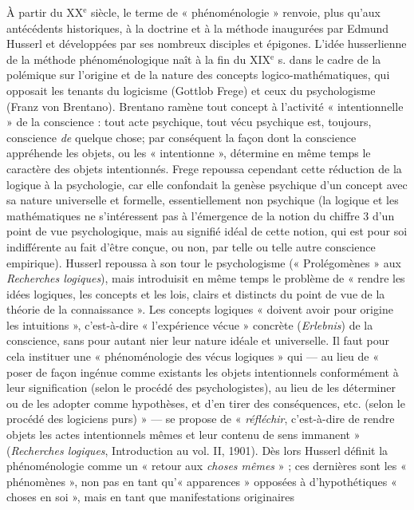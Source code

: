 À partir du {\footnotesize XX}$^\text{e}$ siècle, le terme de « phénoménologie »
renvoie, plus qu'aux antécédents
historiques, à la doctrine et à la
méthode inaugurées par Edmund Husserl
et développées par ses nombreux disciples
et épigones. L'idée husserlienne de la
méthode phénoménologique naît à la fin
du {\footnotesize XIX}$^\text{e}$ s. dans le cadre de la polémique
sur l’origine et de la nature des
concepts  logico-mathématiques, qui
opposait les tenants du logicisme (Gottlob
Frege) et ceux du psychologisme (Franz
von Brentano). Brentano ramène tout
concept à l’activité « intentionnelle » de la
conscience : tout acte psychique, tout
vécu psychique est, toujours, conscience
{\it de} quelque chose; par conséquent la
façon dont la conscience appréhende les
objets, ou les « intentionne », détermine
en même temps le caractère des objets
intentionnés. Frege repoussa cependant
cette réduction de la logique à la psychologie,
car elle confondait la genèse psychique
d’un concept avec sa nature
universelle et formelle, essentiellement
non psychique (la logique et les mathématiques
ne s'intéressent pas à l’émergence
de la notion du chiffre 3 d’un point de vue
psychologique, mais au signifié idéal de
cette notion, qui est pour soi indifférente
au fait d’être conçue, ou non, par telle ou
telle autre conscience empirique). Husserl
repoussa à son tour le psychologisme
(« Prolégomènes » aux {\it Recherches
logiques}), mais introduisit en même temps
le problème de « rendre les idées
logiques, les concepts et les lois, clairs et
distincts du point de vue de la théorie de
la connaissance ». Les concepts logiques
« doivent avoir pour origine les intuitions »,
c’est-à-dire « l'expérience vécue »
concrète ({\it Erlebnis}) de la conscience, sans
pour autant nier leur nature idéale et universelle.
Il faut pour cela instituer une
« phénoménologie des vécus logiques »
qui — au lieu de « poser de façon ingénue
comme existants les objets intentionnels
conformément à leur signification (selon
le procédé des psychologistes), au lieu de
les déterminer ou de les adopter comme
hypothèses, et d’en tirer des conséquences,
etc. (selon le procédé des logiciens purs) »
— se propose de « {\it réfléchir},
c’est-à-dire de rendre objets les actes
intentionnels mêmes et leur contenu de
sens immanent » ({\it Recherches logiques},
Introduction au vol. II, 1901). Dès lors
Husserl définit la phénoménologie
comme un « retour aux {\it choses mêmes} » ;
ces dernières sont les « phénomènes »,
non pas en tant qu’« apparences » opposées
à d’hypothétiques « choses en soi »,
mais en tant que manifestations originaires
